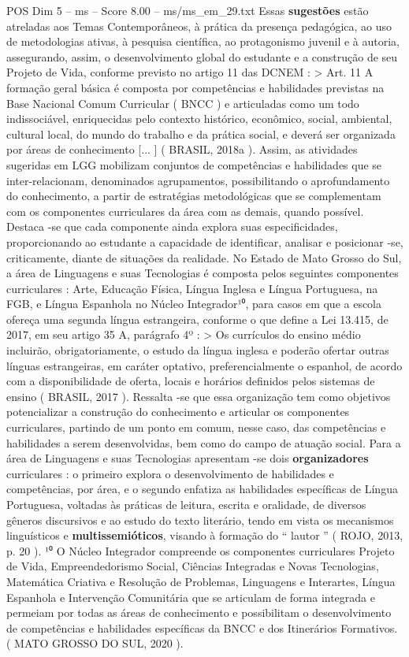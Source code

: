 \begin{textsample}{POS Dim 5 – ms – Score 8.00 – ms/ms\_em\_29.txt}
Essas \textbf{sugestões} estão atreladas aos Temas Contemporâneos, à prática da presença pedagógica, ao uso de metodologias ativas, à pesquisa científica, ao protagonismo juvenil e à autoria, assegurando, assim, o desenvolvimento global do estudante e a construção de seu Projeto de Vida, conforme previsto no artigo 11 das DCNEM : > Art. 11 A formação geral básica é composta por competências e habilidades previstas na Base Nacional Comum Curricular ( BNCC ) e articuladas como um todo indissociável, enriquecidas pelo contexto histórico, econômico, social, ambiental, cultural local, do mundo do trabalho e da prática social, e deverá ser organizada por áreas de conhecimento [... ] ( BRASIL, 2018a ).
Assim, as atividades sugeridas em LGG mobilizam conjuntos de competências e habilidades que se inter-relacionam, denominados agrupamentos, possibilitando o aprofundamento do conhecimento, a partir de estratégias metodológicas que se complementam com os componentes curriculares da área com as demais, quando possível.
Destaca -se que cada componente ainda explora suas especificidades, proporcionando ao estudante a capacidade de identificar, analisar e posicionar -se, criticamente, diante de situações da realidade.
No Estado de Mato Grosso do Sul, a área de Linguagens e suas Tecnologias é composta pelos seguintes componentes curriculares : Arte, Educação Física, Língua Inglesa e Língua Portuguesa, na FGB, e Língua Espanhola no Núcleo Integrador¹⁰, para casos em que a escola ofereça uma segunda língua estrangeira, conforme o que define a Lei 13.415, de 2017, em seu artigo 35 A, parágrafo 4º : > Os currículos do ensino médio incluirão, obrigatoriamente, o estudo da língua inglesa e poderão ofertar outras línguas estrangeiras, em caráter optativo, preferencialmente o espanhol, de acordo com a disponibilidade de oferta, locais e horários definidos pelos sistemas de ensino ( BRASIL, 2017 ).
Ressalta -se que essa organização tem como objetivos potencializar a construção do conhecimento e articular os componentes curriculares, partindo de um ponto em comum, nesse caso, das competências e habilidades a serem desenvolvidas, bem como do campo de atuação social.
Para a área de Linguagens e suas Tecnologias apresentam -se dois \textbf{organizadores} curriculares : o primeiro explora o desenvolvimento de habilidades e competências, por área, e o segundo enfatiza as habilidades específicas de Língua Portuguesa, voltadas às práticas de leitura, escrita e oralidade, de diversos gêneros discursivos e ao estudo do texto literário, tendo em vista os mecanismos linguísticos e \textbf{multissemióticos}, visando à formação do “ lautor ” ( ROJO, 2013, p. 20 ). ¹⁰ O Núcleo Integrador compreende os componentes curriculares Projeto de Vida, Empreendedorismo Social, Ciências Integradas e Novas Tecnologias, Matemática Criativa e Resolução de Problemas, Linguagens e Interartes, Língua Espanhola e Intervenção Comunitária que se articulam de forma integrada e permeiam por todas as áreas de conhecimento e possibilitam o desenvolvimento de competências e habilidades específicas da BNCC e dos Itinerários Formativos. ( MATO GROSSO DO SUL, 2020 ).

\end{textsample}
